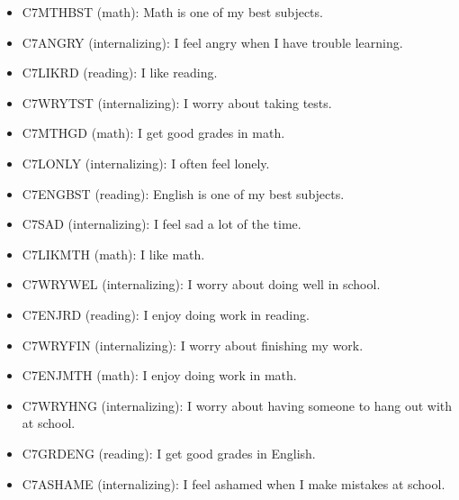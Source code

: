 \documentclass[doc,floatsintext,natbib]{apa7}
\begin{document}
\begin{itemize}

  \item C7MTHBST (math): Math is one of my best subjects.

  \item C7ANGRY (internalizing): I feel angry when I have trouble learning.

  \item C7LIKRD (reading): I like reading.

  \item C7WRYTST (internalizing): I worry about taking tests.

  \item C7MTHGD (math): I get good grades in math.

  \item C7LONLY (internalizing): I often feel lonely.

  \item C7ENGBST (reading): English is one of my best subjects.

  \item C7SAD (internalizing): I feel sad a lot of the time.

  \item C7LIKMTH (math): I like math.

  \item C7WRYWEL (internalizing): I worry about doing well in school.

  \item C7ENJRD (reading): I enjoy doing work in reading.

  \item C7WRYFIN (internalizing): I worry about finishing my work.

  \item C7ENJMTH (math): I enjoy doing work in math.

  \item C7WRYHNG (internalizing): I worry about having someone to hang out with at school.

  \item C7GRDENG (reading): I get good grades in English.

  \item C7ASHAME (internalizing): I feel ashamed when I make mistakes at school.

\end{itemize}
\end{document}
